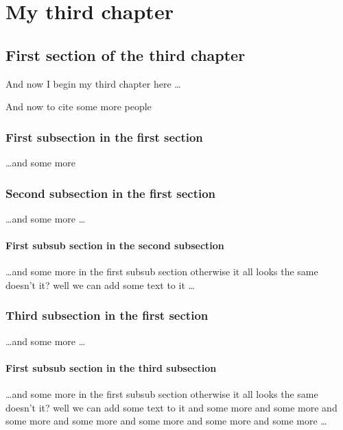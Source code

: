 \chapter{My third chapter}

\ifpdf
    \graphicspath{{Chapter3/Figs/Raster/}{Chapter3/Figs/PDF/}{Chapter3/Figs/}}
\else
    \graphicspath{{Chapter3/Figs/Vector/}{Chapter3/Figs/}}
\fi

\section{First section of the third chapter}
And now I begin my third chapter here \dots

And now to cite some more people~\cite{Rea85,Ancey1996}

\subsection{First subsection in the first section}
\dots and some more 

\subsection{Second subsection in the first section}
\dots and some more \dots

\subsubsection{First subsub section in the second subsection}
\dots and some more in the first subsub section otherwise it all looks the same
doesn't it? well we can add some text to it \dots

\subsection{Third subsection in the first section}
\dots and some more \dots

\subsubsection{First subsub section in the third subsection}
\dots and some more in the first subsub section otherwise it all looks the same
doesn't it? well we can add some text to it and some more and some more and
some more and some more and some more and some more and some more \dots

